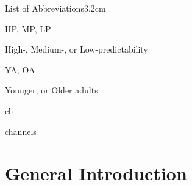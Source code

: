 \documentclass[a4paper, nobind]{templates/ociamthesis}
\begin{document}
\begin{romanpages}
  \dominitoc %

\flushbottom

\tableofcontents

\listoffigures
	\mtcaddchapter

\listoftables
  \mtcaddchapter
\begin{mclistof}{List of Abbreviations}{3.2cm}

\item[HP, MP, LP]

High-, Medium-, or Low-predictability

\item[YA, OA]

Younger, or Older adults

\item[ch]

channels

\end{mclistof} 


\end{romanpages}

\flushbottom

\hypertarget{general-introduction}{%
\chapter{General Introduction}\label{general-introduction}}
\end{document}
